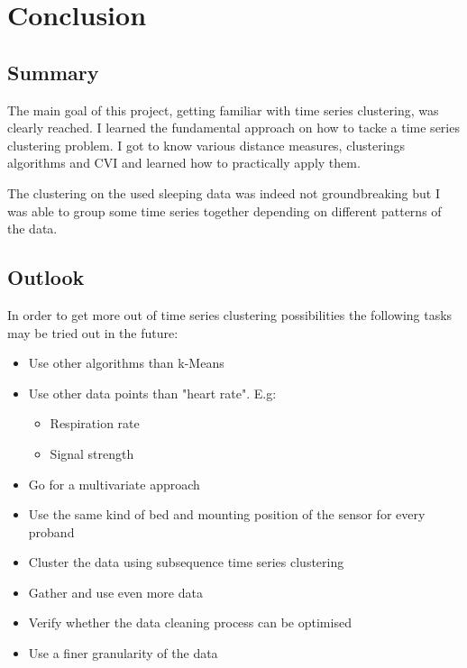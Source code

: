 \chapter{Conclusion}

\section{Summary}

The main goal of this project, getting familiar with time series clustering, was clearly reached. I learned the fundamental approach on how to tacke a time series clustering problem. I got to know various distance measures, clusterings algorithms and CVI and learned how to practically apply them.

The clustering on the used sleeping data was indeed not groundbreaking but I was able to group some time series together depending on different patterns of the data.


\section{Outlook}

In order to get more out of time series clustering possibilities the following tasks may be tried out in the future:


\begin{itemize}
  \item Use other algorithms than k-Means
  \item Use other data points than "heart rate". E.g:
  \begin{itemize}
  	\item Respiration rate
  	\item Signal strength
  \end{itemize}
  \item Go for a multivariate approach
  \item Use the same kind of bed and mounting position of the sensor for every proband
  \item Cluster the data using subsequence time series clustering
  \item Gather and use even more data
  \item Verify whether the data cleaning process can be optimised
  \item Use a finer granularity of the data
\end{itemize}
